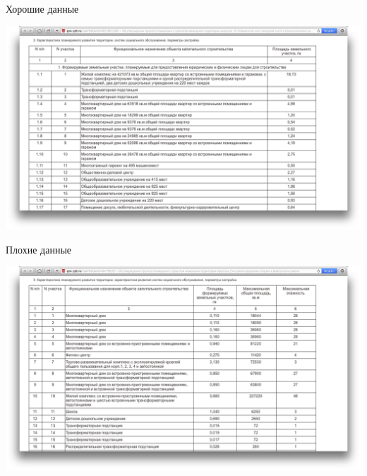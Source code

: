 \documentclass[14pt, fleqn, xcolor={dvipsnames, table}]{beamer}
\begin{document}
        \begin{frame}{Хорошие данные}
            \begin{center}
                \includegraphics[scale=0.23]{good.png}
            \end{center} 
        \end{frame}      
        
        \begin{frame}{Плохие данные}
            \begin{center}
                \includegraphics[scale=0.23]{bad.png}
            \end{center} 
        \end{frame}   
        
\end{document}
